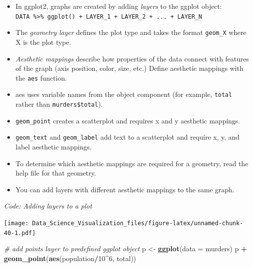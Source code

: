\documentclass[
]{article}
\newenvironment{Shaded}{\begin{snugshade}}{\end{snugshade}}
\newcommand{\CommentTok}[1]{\textcolor[rgb]{0.56,0.35,0.01}{\textit{#1}}}
\newcommand{\DataTypeTok}[1]{\textcolor[rgb]{0.13,0.29,0.53}{#1}}
\newcommand{\DecValTok}[1]{\textcolor[rgb]{0.00,0.00,0.81}{#1}}
\newcommand{\KeywordTok}[1]{\textcolor[rgb]{0.13,0.29,0.53}{\textbf{#1}}}
\newcommand{\NormalTok}[1]{#1}
\newcommand{\OperatorTok}[1]{\textcolor[rgb]{0.81,0.36,0.00}{\textbf{#1}}}
\newcommand{\StringTok}[1]{\textcolor[rgb]{0.31,0.60,0.02}{#1}}
\providecommand{\tightlist}{%
  \setlength{\itemsep}{0pt}\setlength{\parskip}{0pt}}
\begin{document}
\begin{itemize}
\tightlist
\item
  In ggplot2, graphs are created by adding \emph{layers} to the ggplot
  object:
  \texttt{DATA\ \%\textgreater{}\%\ ggplot()\ +\ LAYER\_1\ +\ LAYER\_2\ +\ ...\ +\ LAYER\_N}
\item
  The \emph{geometry layer} defines the plot type and takes the format
  \texttt{geom\_X} where X is the plot type.
\item
  \emph{Aesthetic mappings} describe how properties of the data connect
  with features of the graph (axis position, color, size, etc.) Define
  aesthetic mappings with the \texttt{aes} function.
\item
  aes uses variable names from the object component (for example,
  \texttt{total} rather than \texttt{murders\$total}).
\item
  \texttt{geom\_point} creates a scatterplot and requires x and y
  aesthetic mappings.
\item
  \texttt{geom\_text} and \texttt{geom\_label} add text to a scatterplot
  and require x, y, and label aesthetic mappings.
\item
  To determine which aesthetic mappings are required for a geometry,
  read the help file for that geometry.
\item
  You can add layers with different aesthetic mappings to the same
  graph.
\end{itemize}

\emph{Code: Adding layers to a plot}

\begin{Shaded}
\end{Shaded}

\texttt{[image: Data\_Science\_Visualization\_files/figure-latex/unnamed-chunk-40-1.pdf]}

\begin{Shaded}
\begin{Highlighting}[]
\CommentTok{# add points layer to predefined ggplot object}
\NormalTok{p <-}\StringTok{ }\KeywordTok{ggplot}\NormalTok{(}\DataTypeTok{data =}\NormalTok{ murders)}
\NormalTok{p }\OperatorTok{+}\StringTok{ }\KeywordTok{geom_point}\NormalTok{(}\KeywordTok{aes}\NormalTok{(population}\OperatorTok{/}\DecValTok{10}\OperatorTok{^}\DecValTok{6}\NormalTok{, total))}
\end{Highlighting}
\end{Shaded}
\end{document}
